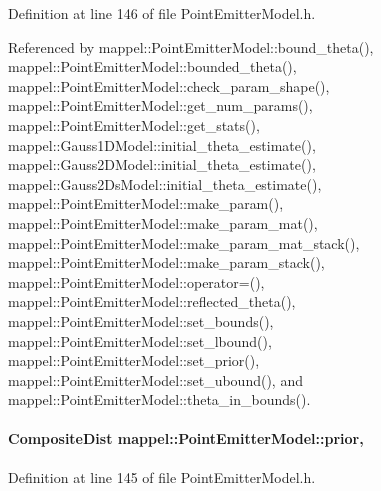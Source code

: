 Definition at line 146 of file Point\+Emitter\+Model.\+h.



Referenced by mappel\+::\+Point\+Emitter\+Model\+::bound\+\_\+theta(), mappel\+::\+Point\+Emitter\+Model\+::bounded\+\_\+theta(), mappel\+::\+Point\+Emitter\+Model\+::check\+\_\+param\+\_\+shape(), mappel\+::\+Point\+Emitter\+Model\+::get\+\_\+num\+\_\+params(), mappel\+::\+Point\+Emitter\+Model\+::get\+\_\+stats(), mappel\+::\+Gauss1\+D\+Model\+::initial\+\_\+theta\+\_\+estimate(), mappel\+::\+Gauss2\+D\+Model\+::initial\+\_\+theta\+\_\+estimate(), mappel\+::\+Gauss2\+Ds\+Model\+::initial\+\_\+theta\+\_\+estimate(), mappel\+::\+Point\+Emitter\+Model\+::make\+\_\+param(), mappel\+::\+Point\+Emitter\+Model\+::make\+\_\+param\+\_\+mat(), mappel\+::\+Point\+Emitter\+Model\+::make\+\_\+param\+\_\+mat\+\_\+stack(), mappel\+::\+Point\+Emitter\+Model\+::make\+\_\+param\+\_\+stack(), mappel\+::\+Point\+Emitter\+Model\+::operator=(), mappel\+::\+Point\+Emitter\+Model\+::reflected\+\_\+theta(), mappel\+::\+Point\+Emitter\+Model\+::set\+\_\+bounds(), mappel\+::\+Point\+Emitter\+Model\+::set\+\_\+lbound(), mappel\+::\+Point\+Emitter\+Model\+::set\+\_\+prior(), mappel\+::\+Point\+Emitter\+Model\+::set\+\_\+ubound(), and mappel\+::\+Point\+Emitter\+Model\+::theta\+\_\+in\+\_\+bounds().

\paragraph[{\texorpdfstring{prior}{prior}}]{\setlength{\rightskip}{0pt plus 5cm}Composite\+Dist mappel\+::\+Point\+Emitter\+Model\+::prior\hspace{0.3cm}{\ttfamily [protected]}, {\ttfamily [inherited]}}\hypertarget{classmappel_1_1PointEmitterModel_a393839f8eb1dd3d61c9369377742ba0e}{}\label{classmappel_1_1PointEmitterModel_a393839f8eb1dd3d61c9369377742ba0e}


Definition at line 145 of file Point\+Emitter\+Model.\+h.



